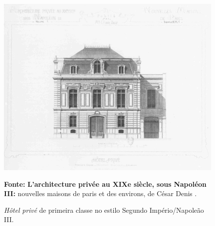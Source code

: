 \begin{figure}[!htp]
\centering
\caption{\textit{Hôtel privé} de primeira classe no estilo Segundo Império/Napoleão III.}
\includegraphics[width=1\textwidth]{2-cap1/complementos/fotos/daly01-0.JPEG}{\par \footnotesize \textbf{Fonte:} \textbf{L’architecture privée au XIXe siècle, sous Napoléon III:} nouvelles maisons de paris et des environs, de César Denis . \par}
\label{fig:hotelprimclas} 
\end{figure}

